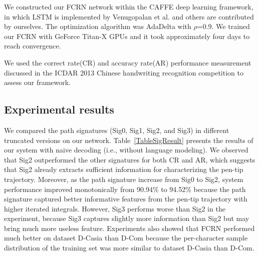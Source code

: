 \documentclass[10pt,conference,a4paper]{IEEEtran}
\begin{document}
We constructed our FCRN network within the CAFFE\cite{jia2014caffe} deep learning framework, in which LSTM is implemented by Venugopalan et al.\cite{venugopalan2015sequence} and others are contributed by ourselves.
The optimization algorithm was AdaDelta with $\rho$=0.9. We trained our FCRN with GeForce Titan-X GPUs and it took approximately four days to reach convergence.


We used the correct rate(CR) and accuracy rate(AR) performance measurement discussed in the ICDAR 2013 Chinese handwriting recognition competition\cite{liuicdar} to assess our framework.






\subsection{Experimental results}
We compared the path signatures (Sig0, Sig1, Sig2, and Sig3) in different truncated versions on our network.
Table~\ref{TableSigResult} presents the results of our system with naive decoding (i.e., without language modeling).
We observed that Sig2 outperformed the other signatures for both CR and AR, which suggests that Sig2 already extracts sufficient information for characterizing the pen-tip trajectory.
Moreover, as the path signature increase from Sig0 to Sig2, system performance improved monotonically from 90.94\% to 94.52\% because the path signature captured better informative features from the pen-tip trajectory with higher iterated integrals.
However, Sig3 performs worse than Sig2 in the experiment, because Sig3 captures slightly more information than Sig2 but may bring much more useless feature.
Experiments also showed that FCRN performed much better on dataset D-Casia than D-Com because the per-character sample distribution of the training set was more similar to dataset D-Casia than D-Com.
\end{document}

